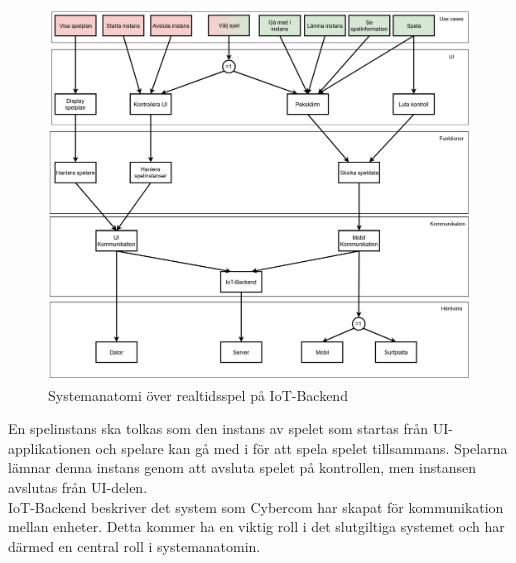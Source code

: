 \documentclass[10pt]{article}
\begin{document}
		\begin{figure}[h]
			\centering
			\includegraphics[scale=0.4]{systemanatomi_graf}
			\caption{Systemanatomi över realtidsspel på IoT-Backend}
			\label{fig:graf}
		\end{figure}	
	\pagebreak
	En spelinstans ska tolkas som den instans av spelet som startas från UI-applikationen och spelare kan gå med i för att spela spelet tillsammans. Spelarna lämnar denna instans genom att avsluta spelet på kontrollen, men instansen avslutas från UI-delen.\\
	
	IoT-Backend beskriver det system som Cybercom har skapat för kommunikation mellan enheter. Detta kommer ha en viktig roll i det slutgiltiga systemet och har därmed en central roll i systemanatomin.\\
	
\end{document}
